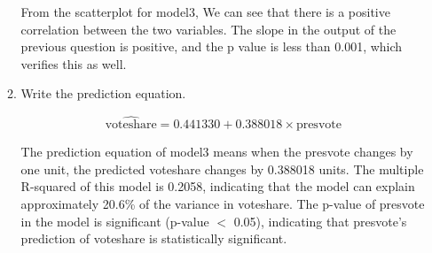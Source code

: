 \documentclass[12pt,letterpaper]{article}
\begin{document}
\begin{enumerate}
\begin{enumerate}
		\noindent From the scatterplot for model3, We can see that there is a positive correlation between the two variables. The slope in the output of the previous question is positive, and the p value is less than 0.001, which verifies this as well.
		
			\vspace{5cm}
		\item Write the prediction equation.
		
				\begin{equation}
			\hat{\text{{voteshare}}} = 0.441330  + 0.388018 \times \text{{presvote}}
		\end{equation}
		
		\noindent The prediction equation of model3 means when the presvote changes by one unit, the predicted voteshare changes by 0.388018 units. The multiple R-squared of this model is 0.2058, indicating that the model can explain approximately 20.6\% of the variance in voteshare. The  p-value of presvote in the model is significant (p-value $<$ 0.05), indicating that presvote's prediction of voteshare is statistically significant.
		\end{enumerate}
		
		
		
	\end{enumerate}
	

\newpage	
\end{document}
